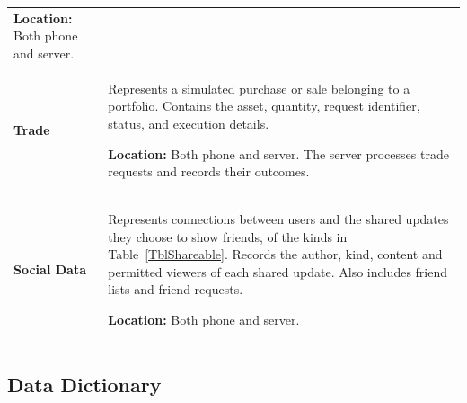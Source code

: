 \documentclass[12pt]{article}
\begin{document}
\begin{longtable}{@{}p{} p{}@{}}
\textbf{Location:} Both phone and server.\\
\addlinespace

\textbf{Trade} &
Represents a simulated purchase or sale belonging to a portfolio.
Contains the asset, quantity, request identifier, status,
and execution details.

\textbf{Location:} Both phone and server. The server processes
trade requests and records their outcomes.\\
\addlinespace

\textbf{Social Data} &
Represents connections between users and the shared updates they
choose to show friends, of the kinds in Table~\ref{TblShareable}.
Records the author, kind, content and permitted viewers of each
shared update.
Also includes friend lists and friend requests.

\textbf{Location:} Both phone and server.\\

\bottomrule
\end{longtable}


\subsection{Data Dictionary} \label{SecDataDictionary}
\end{document}
